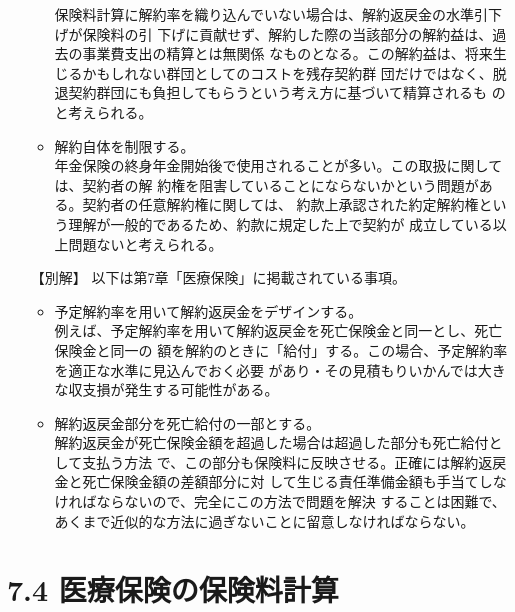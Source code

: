 \documentclass[report,gutter=10mm,fore-edge=10mm,uplatex,dvipdfmx]{jlreq}
\begin{document}
\begin{itemize}
\begin{itemize}
保険料計算に解約率を織り込んでいない場合は、解約返戻金の水準引下げが保険料の引
下げに貢献せず、解約した際の当該部分の解約益は、過去の事業費支出の精算とは無関係
なものとなる。この解約益は、将来生じるかもしれない群団としてのコストを残存契約群
団だけではなく、脱退契約群団にも負担してもらうという考え方に基づいて精算されるも
のと考えられる。
 \item 解約自体を制限する。\\
年金保険の終身年金開始後で使用されることが多い。この取扱に関しては、契約者の解
約権を阻害していることにならないかという問題がある。契約者の任意解約権に関しては、
約款上承認された約定解約権という理解が一般的であるため、約款に規定した上で契約が
成立している以上問題ないと考えられる。
\end{itemize}
 \item [【別解】]以下は第7章「医療保険」に掲載されている事項。
\begin{itemize}
 \item 予定解約率を用いて解約返戻金をデザインする。\\
例えば、予定解約率を用いて解約返戻金を死亡保険金と同一とし、死亡保険金と同一の
額を解約のときに「給付」する。この場合、予定解約率を適正な水準に見込んでおく必要
があり・その見積もりいかんでは大きな収支損が発生する可能性がある。
 \item 解約返戻金部分を死亡給付の一部とする。\\
解約返戻金が死亡保険金額を超過した場合は超過した部分も死亡給付として支払う方法
で、この部分も保険料に反映させる。正確には解約返戻金と死亡保険金額の差額部分に対
して生じる責任準備金額も手当てしなければならないので、完全にこの方法で問題を解決
することは困難で、あくまで近似的な方法に過ぎないことに留意しなければならない。
\end{itemize}
\end{itemize}
\section{7.4 医療保険の保険料計算}
\end{document}
